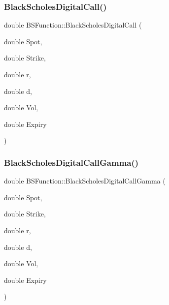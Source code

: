 \hypertarget{namespaceBSFunction_aefcfdd0b3724f9cd25fe48d5416992cc}{}\label{namespaceBSFunction_aefcfdd0b3724f9cd25fe48d5416992cc} 
\subsubsection{\texorpdfstring{Black\+Scholes\+Digital\+Call()}{BlackScholesDigitalCall()}}
{\footnotesize\ttfamily double B\+S\+Function\+::\+Black\+Scholes\+Digital\+Call (\begin{DoxyParamCaption}\item[{double}]{Spot,  }\item[{double}]{Strike,  }\item[{double}]{r,  }\item[{double}]{d,  }\item[{double}]{Vol,  }\item[{double}]{Expiry }\end{DoxyParamCaption})}

\hypertarget{namespaceBSFunction_a27c85b93fb29693d68550920a366aa91}{}\label{namespaceBSFunction_a27c85b93fb29693d68550920a366aa91} 
\subsubsection{\texorpdfstring{Black\+Scholes\+Digital\+Call\+Gamma()}{BlackScholesDigitalCallGamma()}}
{\footnotesize\ttfamily double B\+S\+Function\+::\+Black\+Scholes\+Digital\+Call\+Gamma (\begin{DoxyParamCaption}\item[{double}]{Spot,  }\item[{double}]{Strike,  }\item[{double}]{r,  }\item[{double}]{d,  }\item[{double}]{Vol,  }\item[{double}]{Expiry }\end{DoxyParamCaption})}

\hypertarget{namespaceBSFunction_a336cdef40f9b9416b156dd6561a30733}{}\label{namespaceBSFunction_a336cdef40f9b9416b156dd6561a30733} 
